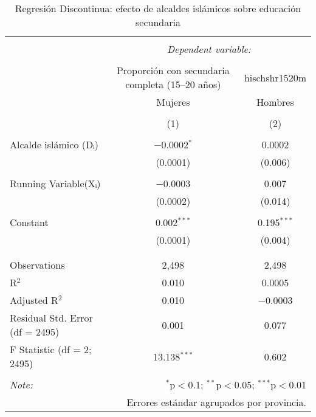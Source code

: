 
\begin{table}[ht!] \centering 
  \caption{Regresión Discontinua: efecto de alcaldes islámicos sobre educación secundaria} 
  \label{tab:rd_mujeres_hombres} 
\begin{tabular}{@{\extracolsep{5pt}}lcc} 
\\[-1.8ex]\hline 
\hline \\[-1.8ex] 
 & \multicolumn{2}{c}{\textit{Dependent variable:}} \\ 
\cline{2-3} 
\\[-1.8ex] & Proporción con secundaria completa (15–20 años) & hischshr1520m \\ 
 & Mujeres & Hombres \\ 
\\[-1.8ex] & (1) & (2)\\ 
\hline \\[-1.8ex] 
 Alcalde islámico (Dᵢ) & $-$0.0002$^{*}$ & 0.0002 \\ 
  & (0.0001) & (0.006) \\ 
  & & \\ 
 Running Variable(Xᵢ) & $-$0.0003 & 0.007 \\ 
  & (0.0002) & (0.014) \\ 
  & & \\ 
 Constant & 0.002$^{***}$ & 0.195$^{***}$ \\ 
  & (0.0001) & (0.004) \\ 
  & & \\ 
\hline \\[-1.8ex] 
Observations & 2,498 & 2,498 \\ 
R$^{2}$ & 0.010 & 0.0005 \\ 
Adjusted R$^{2}$ & 0.010 & $-$0.0003 \\ 
Residual Std. Error (df = 2495) & 0.001 & 0.077 \\ 
F Statistic (df = 2; 2495) & 13.138$^{***}$ & 0.602 \\ 
\hline 
\hline \\[-1.8ex] 
\textit{Note:}  & \multicolumn{2}{r}{$^{*}$p$<$0.1; $^{**}$p$<$0.05; $^{***}$p$<$0.01} \\ 
 & \multicolumn{2}{r}{Errores estándar agrupados por provincia.} \\ 
\end{tabular} 
\end{table} 
